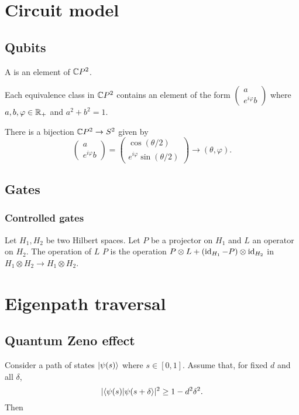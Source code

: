 \chapter{Circuit model}
\section{Qubits}
\begin{definition}
A  is an element of $\mathbb{C} P^2$.
\end{definition}

\begin{lemma}
Each equivalence class in $\mathbb{C} P^2$ contains an element of the form $\begin{pmatrix}
a \\ e^{i\varphi} b
\end{pmatrix}$ where $a,b, \varphi\in \mathbb{R}_+$ and $a^2 + b^2 = 1$.
\end{lemma}
\begin{corollary}
There is a bijection $\mathbb{C} P^2 \to S^2$ given by
\[ \begin{pmatrix}
a \\ e^{i\varphi} b
\end{pmatrix} = \begin{pmatrix}
\cos(\theta / 2) \\ e^{i\varphi}\sin(\theta / 2)
\end{pmatrix} \to (\theta, \varphi). \]
\end{corollary}

\section{Gates}

\subsection{Controlled gates}
\begin{definition}
Let $H_1, H_2$ be two Hilbert spaces. Let $P$ be a projector on $H_1$ and $L$ an operator on $H_2$. The operation of $L$  $P$ is the operation $P\otimes L + (\operatorname{id}_{H_1} - P)\otimes \operatorname{id}_{H_2}$ in $H_1\otimes H_2 \to H_1\otimes H_2$. 
\end{definition}

\chapter{Eigenpath traversal}
\section{Quantum Zeno effect}
\begin{proposition}
Consider a path of states $\left| \psi(s) \right\rangle$ where $s\in[0,1]$. Assume that, for fixed $d$ and all $\delta$,
\[ |\braket{\psi(s)}{\psi(s+\delta}|^2 \geq 1-d^2\delta^2. \]
Then 
\end{proposition}

